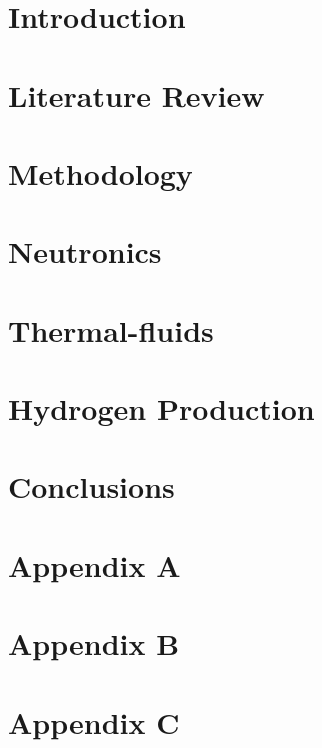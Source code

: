 \documentclass[edeposit,fullpage]{uiucthesis2018}
\begin{document}
\tableofcontents
\listoftables
\listoffigures


\pagebreak
\mainmatter

\chapter{Introduction}


\chapter{Literature Review}


\chapter{Methodology}


\chapter{Neutronics}


\chapter{Thermal-fluids}


\chapter{Hydrogen Production}


\chapter{Conclusions}


\chapter*{Appendix A}
\setcounter{chapter}{8}
\setcounter{section}{0}
\setcounter{equation}{0}


\chapter*{Appendix B}
\setcounter{chapter}{9}
\setcounter{section}{0}
\setcounter{equation}{0}


\chapter*{Appendix C}
\setcounter{chapter}{10}
\setcounter{section}{0}
\setcounter{equation}{0}


\backmatter

% 


\end{document}
